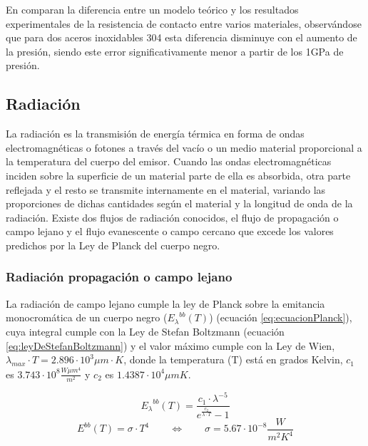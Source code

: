 En \cite{experimental_Rc_SS} comparan la diferencia entre un modelo teórico y los resultados experimentales de la resistencia de contacto entre varios materiales, observándose que para dos aceros inoxidables 304 esta diferencia disminuye con el aumento de la presión, siendo este error significativamente menor a partir de los 1GPa de presión.

\subsection{Radiación}
La radiación es la transmisión de energía térmica en forma de ondas electromagnéticas o fotones a través del vacío o un medio material proporcional a la temperatura del cuerpo del emisor. Cuando las ondas electromagnéticas inciden sobre la superficie de un material parte de ella es absorbida, otra parte reflejada y el resto se transmite internamente en el material, variando las proporciones de dichas cantidades según el material y la longitud de onda de la radiación. Existe dos flujos de radiación conocidos, el flujo de propagación o campo lejano y el flujo evanescente o campo cercano que excede los valores predichos por la Ley de Planck del cuerpo negro.\\

\subsubsection{Radiación propagación o campo lejano}
La radiación de campo lejano cumple la ley de Planck sobre la emitancia monocromática de un cuerpo negro (${E_{\lambda}}^{bb}(T)$) (ecuación \ref{eq:ecuacionPlanck}), cuya integral cumple con la Ley de Stefan Boltzmann (ecuación \ref{eq:leyDeStefanBoltzmann}) y el valor máximo cumple con la Ley de Wien, $\lambda_{max}\cdot T=2.896\cdot 10^3 \mu m\cdot K$, donde la temperatura (T) está en grados Kelvin, $c_1$ es $3.743\cdot 10^8 \frac{W\mu m^4}{m^2}$ y $c_2$ es $1.4387\cdot 10^4 \mu mK$.

\begin{equation}
{E_\lambda}^{bb}\left( T \right) = \dfrac{c_1\cdot \lambda^{-5}}{e^{\frac{c_2}{\lambda \cdot T}}-1}
\label{eq:ecuacionPlanck}
\end{equation}
\begin{equation}
{E}^{bb}\left( T \right)=\sigma \cdot T^4 \qquad \Longleftrightarrow \qquad \sigma = 5.67\cdot 10^{-8} \dfrac{W}{m^2 K^4}
\label{eq:leyDeStefanBoltzmann}
\end{equation}


